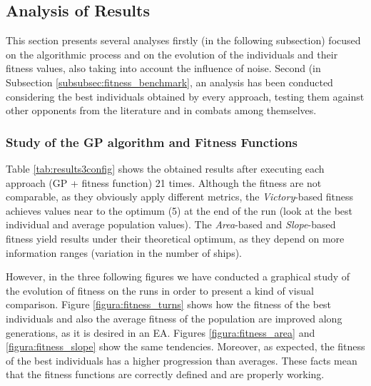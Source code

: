 \documentclass[preprint]{elsarticle}
\begin{document}
\subsection{Analysis of Results}
\label{subsec:results}

This section presents several analyses firstly (in the following subsection)  focused on the algorithmic process and on the evolution of the individuals and their fitness values, also taking into account the influence of noise. Second (in Subsection \ref{subsubsec:fitness_benchmark}, an analysis has been conducted considering the best individuals obtained by every approach, testing them against other opponents from the literature and in combats among themselves.

\subsubsection{Study of the GP algorithm and Fitness Functions}
\label{subsubsec:evolutionary_algorithm}

Table \ref{tab:results3config} shows the obtained results after
executing each approach (GP + fitness function) 21 times. 
Although the fitness are not comparable, as they obviously apply different metrics, the \textit{Victory}-based fitness achieves values near to the optimum (5) at the end of the run (look at the best individual and average population values). The \textit{Area}-based and \textit{Slope}-based fitness yield results under their theoretical optimum, as they depend on more information ranges (variation in the number of ships). 

\begin{table}
\end{table}

However, in the three following figures we have conducted a graphical study of the evolution of fitness on the runs in order to present a kind of visual comparison.
Figure \ref{figura:fitness_turns} shows how the fitness of the best individuals and also the average fitness of the population are improved along generations, as it is desired in an EA. Figures \ref{figura:fitness_area} and \ref{figura:fitness_slope} show the same tendencies. Moreover, as expected, the fitness of the best individuals has a higher progression than averages.
These facts mean that the fitness functions are correctly defined and are properly working.
\end{document}

